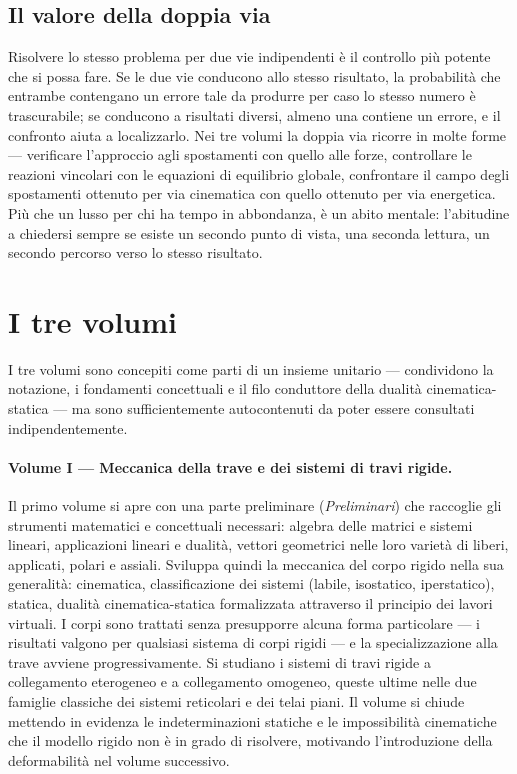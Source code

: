\subsection{Il valore della doppia via}

Risolvere lo stesso problema per due vie indipendenti è il controllo più
potente che si possa fare. Se le due vie conducono allo stesso risultato, la
probabilità che entrambe contengano un errore tale da produrre per caso lo
stesso numero è trascurabile; se conducono a risultati diversi, almeno una
contiene un errore, e il confronto aiuta a localizzarlo. Nei tre volumi la
doppia via ricorre in molte forme --- verificare l'approccio agli spostamenti
con quello alle forze, controllare le reazioni vincolari con le equazioni di
equilibrio globale, confrontare il campo degli spostamenti ottenuto per via
cinematica con quello ottenuto per via energetica. Più che un lusso per chi ha
tempo in abbondanza, è un abito mentale: l'abitudine a chiedersi sempre se
esiste un secondo punto di vista, una seconda lettura, un secondo percorso
verso lo stesso risultato.

\section{I tre volumi}\label{sec:i_tre_volumi}

I tre volumi sono concepiti come parti di un insieme unitario --- condividono la notazione, i fondamenti concettuali e il filo conduttore della dualità cinematica-statica --- ma sono sufficientemente autocontenuti da poter essere consultati indipendentemente.

\paragraph{Volume I --- Meccanica della trave e dei sistemi di travi rigide.}
Il primo volume si apre con una parte preliminare (\emph{Preliminari}) che raccoglie gli strumenti matematici e concettuali necessari: algebra delle matrici e sistemi lineari, applicazioni lineari e dualità, vettori geometrici nelle loro varietà di liberi, applicati, polari e assiali. Sviluppa quindi la meccanica del corpo rigido nella sua generalità: cinematica, classificazione dei sistemi (labile, isostatico, iperstatico), statica, dualità cinematica-statica formalizzata attraverso il principio dei lavori virtuali. I corpi sono trattati senza presupporre alcuna forma particolare --- i risultati valgono per qualsiasi sistema di corpi rigidi --- e la specializzazione alla trave avviene progressivamente. Si studiano i sistemi di travi rigide a collegamento eterogeneo e a collegamento omogeneo, queste ultime nelle due famiglie classiche dei sistemi reticolari e dei telai piani. Il volume si chiude mettendo in evidenza le indeterminazioni statiche e le impossibilità cinematiche che il modello rigido non è in grado di risolvere, motivando l'introduzione della deformabilità nel volume successivo.

